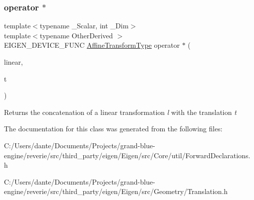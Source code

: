 \subsubsection{\texorpdfstring{operator $\ast$}{operator *}}
{\footnotesize\ttfamily template$<$typename \+\_\+\+Scalar, int \+\_\+\+Dim$>$ \\
template$<$typename Other\+Derived $>$ \\
E\+I\+G\+E\+N\+\_\+\+D\+E\+V\+I\+C\+E\+\_\+\+F\+U\+NC \mbox{\hyperlink{class_eigen_1_1_translation_a25c762409320ba9490a0d12c6652bbad}{Affine\+Transform\+Type}} operator $\ast$ (\begin{DoxyParamCaption}\item[{const \mbox{\hyperlink{struct_eigen_1_1_eigen_base}{Eigen\+Base}}$<$ Other\+Derived $>$ \&}]{linear,  }\item[{const \mbox{\hyperlink{class_eigen_1_1_translation}{Translation}}$<$ \+\_\+\+Scalar, \+\_\+\+Dim $>$ \&}]{t }\end{DoxyParamCaption})\hspace{0.3cm}{\ttfamily [friend]}}

\begin{DoxyReturn}{Returns}
the concatenation of a linear transformation {\itshape l} with the translation {\itshape t} 
\end{DoxyReturn}


The documentation for this class was generated from the following files\+:\begin{DoxyCompactItemize}
\item 
C\+:/\+Users/dante/\+Documents/\+Projects/grand-\/blue-\/engine/reverie/src/third\+\_\+party/eigen/\+Eigen/src/\+Core/util/Forward\+Declarations.\+h\item 
C\+:/\+Users/dante/\+Documents/\+Projects/grand-\/blue-\/engine/reverie/src/third\+\_\+party/eigen/\+Eigen/src/\+Geometry/Translation.\+h\end{DoxyCompactItemize}
